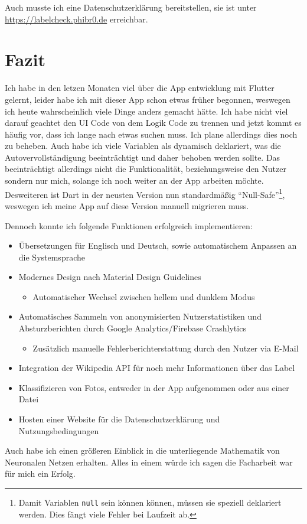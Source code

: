 Auch musste ich eine Datenschutzerklärung bereitstellen, sie ist unter \url{https://labelcheck.phibr0.de} erreichbar.

\section{Fazit}

Ich habe in den letzen Monaten viel über die App entwicklung mit Flutter gelernt, leider habe ich mit dieser App schon etwas früher begonnen, weswegen ich heute wahrscheinlich viele Dinge anders gemacht hätte. Ich habe nicht viel darauf geachtet den UI Code von dem Logik Code zu trennen und jetzt kommt es häufig vor, dass ich lange nach etwas suchen muss. Ich plane allerdings dies noch zu beheben. Auch habe ich viele Variablen als dynamisch deklariert, was die Autovervollständigung beeinträchtigt und daher behoben werden sollte. Das beeinträchtigt allerdings nicht die Funktionalität, beziehungsweise den Nutzer sondern nur mich, solange ich noch weiter an der App arbeiten möchte. Desweiteren ist Dart in der neusten Version nun standardmäßig "`Null-Safe"'\footnote{Damit Variablen \texttt{null} sein können können, müssen sie speziell deklariert werden. Dies fängt viele Fehler bei Laufzeit ab.}, weswegen ich meine App auf diese Version manuell migrieren muss.

Dennoch konnte ich folgende Funktionen erfolgreich implementieren:

\begin{itemize}
  \item Übersetzungen für Englisch und Deutsch, sowie automatischem Anpassen an die Systemsprache
  \item Modernes Design nach Material Design Guidelines
        \begin{itemize}
          \item Automatischer Wechsel zwischen hellem und dunklem Modus
        \end{itemize}
  \item Automatisches Sammeln von anonymisierten Nutzerstatistiken und Absturzberichten durch Google Analytics/Firebase Crashlytics
        \begin{itemize}
          \item Zusätzlich manuelle Fehlerberichterstattung durch den Nutzer via E-Mail
        \end{itemize}
  \item Integration der Wikipedia API für noch mehr Informationen über das Label
  \item Klassifizieren von Fotos, entweder in der App aufgenommen oder aus einer Datei
  \item Hosten einer Website für die Datenschutzerklärung und Nutzungsbedingungen
\end{itemize}

Auch habe ich einen größeren Einblick in die unterliegende Mathematik von Neuronalen Netzen erhalten. Alles in einem würde ich sagen die Facharbeit war für mich ein Erfolg.